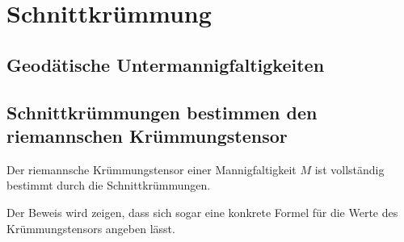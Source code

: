 %
%
\section{Schnittkrümmung
\label{buch:kruemmung:section:schnittkruemmung}}

\subsection{Geodätische Untermannigfaltigkeiten}

\subsection{Schnittkrümmungen bestimmen den riemannschen Krümmungstensor}

\begin{satz}
Der riemannsche Krümmungstensor einer Mannigfaltigkeit $M$
ist vollständig bestimmt durch die Schnittkrümmungen.
\end{satz}

Der Beweis wird zeigen, dass sich sogar eine konkrete Formel
für die Werte des Krümmungstensors angeben lässt.


